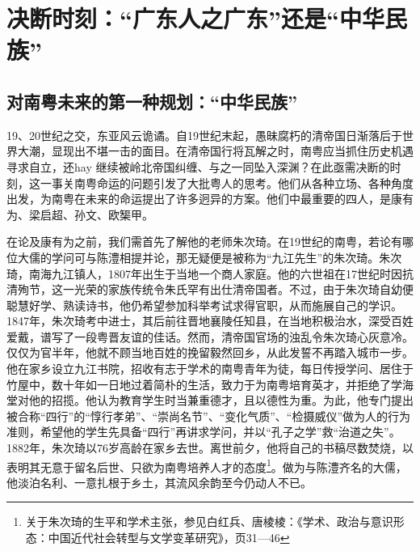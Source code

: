 \chapter{决断时刻：“广东人之广东”还是“中华民族”}

\section{对南粤未来的第一种规划：“中华民族”}

19、20世纪之交，东亚风云诡谲。自19世纪末起，愚昧腐朽的清帝国日渐落后于世界大潮，显现出不堪一击的面目。在清帝国行将瓦解之时，南粤应当抓住历史机遇寻求自立，还hay 继续被岭北帝国纠缠、与之一同坠入深渊？在此亟需决断的时刻，这一事关南粤命运的问题引发了大批粤人的思考。他们从各种立场、各种角度出发，为南粤在未来的命运提出了许多迥异的方案。他们中最重要的四人，是康有为、梁启超、孙文、欧榘甲。

在论及康有为之前，我们需首先了解他的老师朱次琦。在19世纪的南粤，若论有哪位大儒的学问可与陈澧相提并论，那无疑便是被称为“九江先生”的朱次琦。朱次琦，南海九江镇人，1807年出生于当地一个商人家庭。他的六世祖在17世纪时因抗清殉节，这一光荣的家族传统令朱氏罕有出仕清帝国者。不过，由于朱次琦自幼便聪慧好学、熟读诗书，他仍希望参加科举考试求得官职，从而施展自己的学识。1847年，朱次琦考中进士，其后前往晋地襄陵任知县，在当地积极治水，深受百姓爱戴，谱写了一段粤晋友谊的佳话。然而，清帝国官场的浊乱令朱次琦心灰意冷。仅仅为官半年，他就不顾当地百姓的挽留毅然回乡，从此发誓不再踏入城市一步。他在家乡设立九江书院，招收有志于学术的南粤青年为徒，每日传授学问、居住于竹屋中，数十年如一日地过着简朴的生活，致力于为南粤培育英才，并拒绝了学海堂对他的招揽。他认为教育学生时当兼重德才，且以德性为重。为此，他专门提出被合称“四行”的“惇行孝弟”、“崇尚名节”、“变化气质”、“检摄威仪”做为人的行为准则，希望他的学生先具备“四行”再讲求学问，并以“孔子之学”救“治道之失”。1882年，朱次琦以76岁高龄在家乡去世。离世前夕，他将自己的书稿尽数焚烧，以表明其无意于留名后世、只欲为南粤培养人才的态度\footnote{关于朱次琦的生平和学术主张，参见白红兵、唐棱棱：《学术、政治与意识形态：中国近代社会转型与文学变革研究》，页31—46}。做为与陈澧齐名的大儒，他淡泊名利、一意扎根于乡土，其流风余韵至今仍动人不已。

